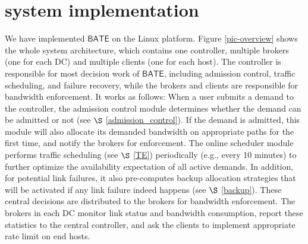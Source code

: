 \documentclass[sigconf]{acmart}
\begin{document}

\section{system implementation} \label{system}
We have implemented $\mathsf{BATE}$ on the Linux platform. Figure \ref{pic-overview} shows the whole system architecture, which contains one controller, multiple brokers (one for each DC) and multiple clients (one for each host). The controller is responsible for most decision work of $\mathsf{BATE}$, including admission control, traffic scheduling, and failure recovery, while the brokers and clients are responsible for bandwidth enforcement.
It works as follows:
When a user submits a demand to the controller, the admission control module determines whether the demand can be admitted or not (see $\S$ \ref{admission_control}).
If the demand is admitted, this module will also allocate its demanded bandwidth on appropriate paths for the first time, and notify the brokers for enforcement. The online scheduler module performs traffic scheduling (see $\S$ \ref{TE}) periodically  (e.g., every 10 minutes) to further optimize the availability expectation of all active demands. In addition, 
for potential link failures, it also pre-computes backup allocation strategies that will be activated if any link failure indeed happens (see $\S$ \ref{backup}). These central decisions are distributed to the brokers for bandwidth enforcement. The brokers in each DC monitor link status and bandwidth consumption, report these statistics to the central controller, and ask the clients to implement appropriate rate limit on end hosts. 
\end{document}
